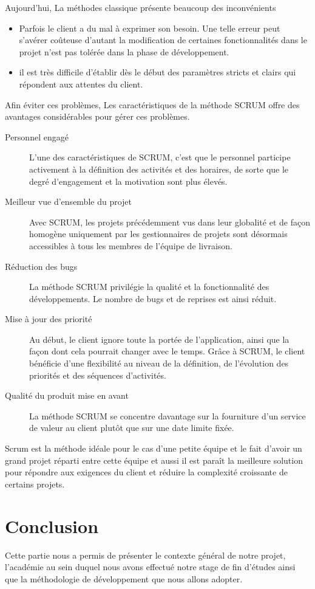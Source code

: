 Aujourd'hui, La méthodes classique présente beaucoup des inconvénients 
\begin{itemize}
 \item Parfois le client a
du mal à exprimer son besoin. Une telle erreur peut s'avérer 
coûteuse d'autant la modification
de certaines fonctionnalités dans le projet n'est pas
tolérée dans la phase de développement.
 \item il est très difficile d'établir dès
le début des paramètres stricts et clairs qui répondent aux attentes du client.
\end{itemize}
Afin éviter ces problèmes, Les caractéristiques de la méthode SCRUM offre
des avantages considérables pour gérer ces problèmes.
\begin{description}
 \item [Personnel engagé] L'une des caractéristiques de SCRUM, 
 c'est que le personnel participe activement à la définition des activités et
 des horaires, de sorte que le degré d'engagement et la motivation sont plus élevés.
 \item [Meilleur vue d'ensemble du projet] Avec SCRUM, les projets 
 précédemment vus dans leur globalité et de façon homogène uniquement par
 les gestionnaires de projets sont désormais accessibles à tous les membres de
 l'équipe de livraison.
 \item [Réduction des bugs] La méthode SCRUM privilégie la qualité et la
 fonctionnalité des développements. Le nombre de bugs et
 de reprises est ainsi réduit.
 \item [Mise à jour des priorité] Au début, le client ignore toute 
 la portée de l'application, ainsi que la façon dont cela pourrait changer avec 
 le temps. Grâce à SCRUM, le client bénéficie d'une flexibilité 
 au niveau de la définition, de l'évolution des priorités et des séquences d'activités.
 \item [Qualité du produit mise en avant] La méthode SCRUM se concentre davantage 
 sur la fourniture d'un service de valeur au client plutôt que sur 
 une date limite fixée.
\end{description}

Scrum est la méthode idéale pour le cas d'une petite équipe et le fait d'avoir un grand 
projet réparti entre cette équipe et aussi il est paraît la meilleure solution pour 
répondre aux exigences du client et réduire la complexité croissante de 
certains projets.

\section*{Conclusion}

Cette partie nous a permis de présenter le contexte général de notre projet, 
l'académie 
au sein duquel nous avons effectué notre stage de fin d'études
ainsi que la méthodologie de développement  que nous allons
adopter.




